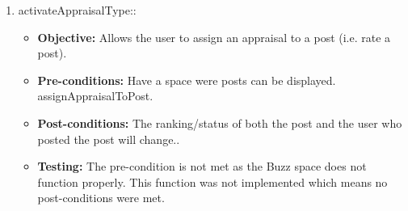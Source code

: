 \begin{enumerate}
\begin{itemize}
	\end{itemize}
\item activateAppraisalType::
	\begin{itemize}
		\item\textbf{Objective: } Allows the user to assign an appraisal to a post (i.e. rate a post).
		\item\textbf{Pre-conditions: }  Have a space were posts can be displayed.	assignAppraisalToPost.
		\item\textbf{Post-conditions: }The ranking/status of both the post and the user who posted the post will change..
		\item\textbf{Testing: } The pre-condition is not met as  the Buzz space does not function properly. This function was not implemented which means no post-conditions were met.
	\end{itemize}
\end{enumerate}